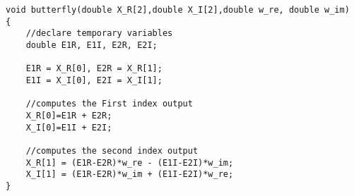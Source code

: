 
\lstset{framesep=-10pt, xleftmargin=-10pt}
\begin{lstlisting}[caption={Sample Code to Implement Butterfly Structure},label={listing:2}]
void butterfly(double X_R[2],double X_I[2],double w_re, double w_im)
{   
    //declare temporary variables
    double E1R, E1I, E2R, E2I;
    
    E1R = X_R[0], E2R = X_R[1];
    E1I = X_I[0], E2I = X_I[1];
    
    //computes the First index output
    X_R[0]=E1R + E2R;
    X_I[0]=E1I + E2I;
    
    //computes the second index output
    X_R[1] = (E1R-E2R)*w_re - (E1I-E2I)*w_im;
    X_I[1] = (E1R-E2R)*w_im + (E1I-E2I)*w_re;
}

\end{lstlisting}

